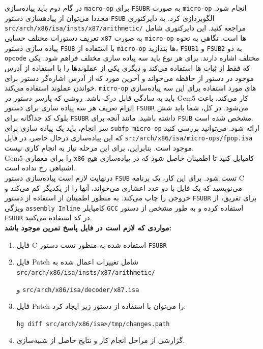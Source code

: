 \documentclass[12pt]{exam}
\begin{document}
در گام دوم باید پیاده‌سازی \texttt{macro-op} برای \texttt{FSUBR} به صورت \texttt{micro-op} انجام شود. مجددا می‌توان از پیادهسازی دستور \texttt{FSUB} الگوبردازی کرد. به دایرکتوری \texttt{src/arch/x86/isa/insts/x87/arithmetic/} مراجعه کنید. این دایرکتوری شامل تعریف دستورات مختلف حسابی \texttt{x87} به صورت \texttt{micro-op} ها است. نگاهی به نحوه پیاده سازی دستور \texttt{FSUB} با استفاده از \texttt{micro-op} ها بندازید، \texttt{FSUB1} و \texttt{FSUB2} به دو \texttt{opcode} مختلف اشاره دارند. برای هر نوع باید سه پیاده سازی مختلف فراهم شود. یکی که فقط از ثبات ها استفاده می‌کند و دیگری یکی از عملوندها را با استفاده از آدرس موجود در دستور از حافظه می‌خواند و ‌‌آخرین مورد که از آدرس اشاره‌گر دستور برای خواندن عملوند استفاده می‌کند. \texttt{micro-op} های مورد استفاده برای این سه پیاده‌سازی باید یه سادگی قابل درک باشد. روشی که پارسر دستور در Gem5 کار می‌کند، باعث الزام تعریف هر سه پیاده سازی برای دستور \texttt{FSUBR} می‌شود. در کل، شما باید شش بلوک کد جداگانه برای \texttt{FSUBR} داشته باشید. مانند آنچه برای \texttt{FSUB} مشخص شده است. \\

سر انجام، باید یک پیاده سازی برای \texttt{subfp micro-op} ارائه شود. می‌توانید بررسی کنید که این پیاده‌سازی درحال حاضر، در فایل \texttt{src/arch/x86/isa/micro-ops/fpop.isa} موجود است. بنابراین، برای این مرحله نیاز به انجام کاری نیست. \\

Gem5 را برای معماری \texttt{x86} کامپایل کنید تا اطمینان حاصل شود که در پیاده‌سازی هیچ اشتباهی رخ نداده است. \\

درنهایت لازم است پیاده‌سازی دستور \texttt{FSUB} تست شود. برای این کار، یک برنامه C می‌نویسید که یک فایل با دو عدد اعشاری می‌خواند، آنها را از یکدیگر کم می‌کند و خروجی را چاپ می‌کند. به منظور اطمینان از استفاده از دستور \texttt{FSUBR} برای تفریق، از ویژگی \texttt{assembly Inline} کامپایلر \texttt{GCC} استفاده کرده و به طور مشخص از دستور \texttt{FSUBR} در کد استفاده می‌کنید. \\

\textbf{مواردی که لازم است در فایل پاسخ تمرین موجود باشد:}
\begin{enumerate}
	\item فایل C استفاده شده به منظور تست دستور \texttt{FSUBR} 
	\item فایل Patch شامل تغییرات اعمال شده به \texttt{src/arch/x86/isa/insts/x87/arithmetic/}  
	
	و \texttt{src/arch/x86/isa/decoder/x87.isa}
	\item فایل Patch را می‌توان با استفاده از دستور زیر ایجاد کرد:
	
	\begin{latin}
		\texttt{hg diff src/arch/x86/isa>/tmp/changes.path} 
	\end{latin}
	
	\item گزارشی از مراحل انجام کار و نتایج حاصل از شبیه‌سازی.
\end{enumerate}
\end{document}
